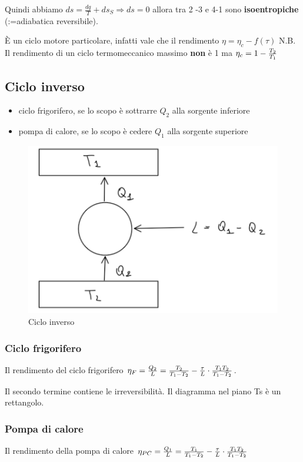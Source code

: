 \documentclass[a4paper]{article}
\numberwithin{equation}{section}%
\begin{document}
Quindi abbiamo $d s=\frac{d q}{T}+d s_{S} \Rightarrow d s=0$ allora tra 2 -3 e 4-1 sono\textbf{ isoentropiche} (:=adiabatica reversibile).

È un ciclo motore particolare, infatti vale che il rendimento $\eta = \eta_c-f\left(\tau\right)$
N.B. Il rendimento di un ciclo termomeccanico massimo \textbf{non} è 1 ma $\eta_c =1-{T_2\over T_1}$

\subsection{Ciclo inverso}

\begin{itemize}
	\item ciclo frigorifero, se lo scopo è sottrarre $Q_2$ alla sorgente inferiore
	\item pompa di calore, se lo scopo è cedere $Q_1$ alla sorgente superiore
\end{itemize}


\begin{figure}[H]
	\begin{center}
		
		\includegraphics[width=0.3\columnwidth]{cicloinverso.png}
		\caption{Ciclo inverso}
	\end{center}
\end{figure}

\subsubsection{Ciclo frigorifero}
Il rendimento del ciclo frigorifero $\eta_F={Q_2\over L}=\frac{T_{2}}{T_{1}-T_{2}}-\frac{\tau}{L} \cdot \frac{T_{1} T_{2}}{T_{1}-T_{2}}$.

Il secondo termine contiene le irreversibilità.
Il diagramma nel piano Ts è un rettangolo.

\subsubsection{Pompa di calore}

Il rendimento della pompa di calore $\eta_{PC}={Q_1\over L}=\frac{T_{1}}{T_{1}-T_{2}}-\frac{\tau}{L} \cdot \frac{T_{1} T_{2}}{T_{1}-T_{2}}$
\end{document}
